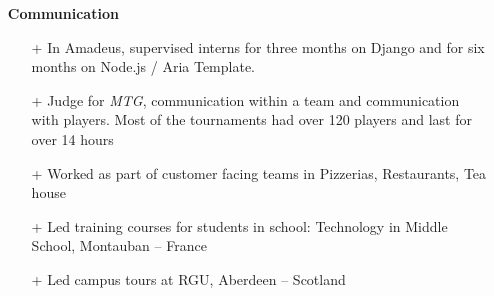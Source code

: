 \documentclass{res}
\begin{document}
\begin{resume}
        \begin{itemize}
        \item[] \textbf{Communication}
            \begin{itemize}
							\item[+] In Amadeus, supervised interns for three months on Django and for six months on Node.js / Aria Template.
                \item[+] Judge for \textit{MTG}, communication within a team and communication with players. Most of the tournaments had over 120 players and last for over 14 hours
                \item[+] Worked as part of customer facing teams in Pizzerias, Restaurants, Tea house
                \item[+] Led training courses for students in school: Technology in Middle School, Montauban -- France
                \item[+]  Led campus tours at RGU, Aberdeen -- Scotland
            \end{itemize} 
        \end{itemize}
        

\end{resume}
\end{document}

